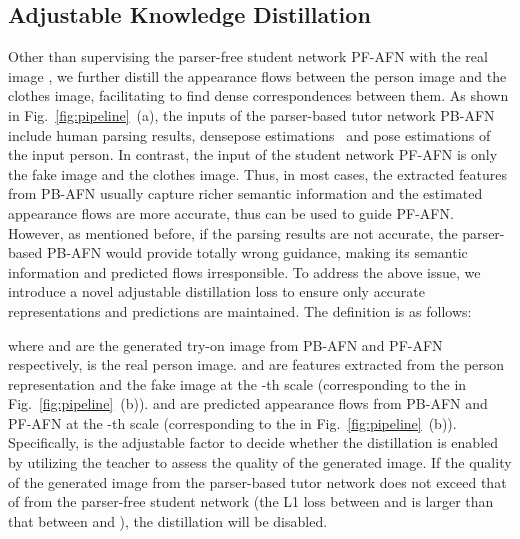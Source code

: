 \documentclass[final]{cvpr}
\begin{document}
	\subsection{Adjustable Knowledge Distillation} \label{sec:kd}
Other than supervising the parser-free student network PF-AFN with the real image , we further distill the appearance flows between the person image and the clothes image, facilitating to find dense correspondences between them.
As shown in Fig.~\ref{fig:pipeline}~(a), the inputs of the parser-based tutor network PB-AFN include human parsing results, densepose estimations~\cite{densepose} and pose estimations of the input person. 
In contrast, the input of the student network PF-AFN is only the fake image and the clothes image. 
Thus, in most cases, the extracted features from PB-AFN usually capture richer semantic information and the estimated appearance flows are more accurate, thus can be used to guide PF-AFN.
However, as mentioned before, if the parsing results are not accurate, the parser-based PB-AFN would provide totally wrong guidance, making its semantic information and predicted flows irresponsible.
To address the above issue, we introduce a novel adjustable distillation loss to ensure only accurate representations and predictions are maintained. The definition is as follows:
\begin{small}
		
	\end{small}
	\begin{small}
		
	\end{small}
	\begin{small}
		
	\end{small}
	\begin{small}
		
	\end{small}
where  and  are the generated try-on image from PB-AFN and PF-AFN respectively,  is the real person image.
 and  are features extracted from the person representation  and the fake image  at the -th scale (\ie corresponding to the  in Fig.~\ref{fig:pipeline}~(b)).
 and  are predicted appearance flows from PB-AFN and PF-AFN at the -th scale (\ie corresponding to the  in Fig.~\ref{fig:pipeline}~(b)).
Specifically,  is the adjustable factor to decide whether the distillation is enabled by utilizing the teacher to assess the quality of the generated image.
If the quality of the generated image  from the parser-based tutor network does not exceed that of  from the parser-free student network (\ie the L1 loss between  and  is larger than that between  and ), the distillation will be disabled. 
	
\end{document}
